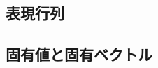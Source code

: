 \documentclass[../sotsu.tex]{subfiles}
\begin{document}
\subsection{表現行列}
\label{representation-matrix}


\subsection{固有値と固有ベクトル}
\label{sec:eigenvalue-and-eigenvector}
\end{document}
